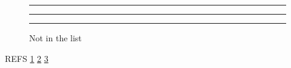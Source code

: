 \documentclass{article}
\begin{document}
\listoffigures
\begin{figure}[h]\centering\rule{2cm}{1cm}\label{p1}\end{figure}
\begin{figure}[h]\centering\rule{2cm}{1cm}\label{p2}\end{figure}
\begin{figure}[h]\centering\rule{2cm}{1cm}\caption[]{Not in the list}\label{p3}\end{figure}
REFS \ref{p1} \ref{p2} \ref{p3}
\end{document}
